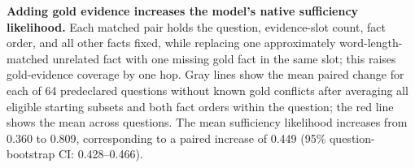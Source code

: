 \textbf{Adding gold evidence increases the model's native sufficiency likelihood.}
Each matched pair holds the question, evidence-slot count, fact order, and all other facts fixed, while replacing one approximately word-length-matched unrelated fact with one missing gold fact in the same slot; this raises gold-evidence coverage by one hop.
Gray lines show the mean paired change for each of 64 predeclared questions without known gold conflicts after averaging all eligible starting subsets and both fact orders within the question; the red line shows the mean across questions.
The mean sufficiency likelihood increases from 0.360 to 0.809, corresponding to a paired increase of 0.449 (95\% question-bootstrap CI: 0.428--0.466).
